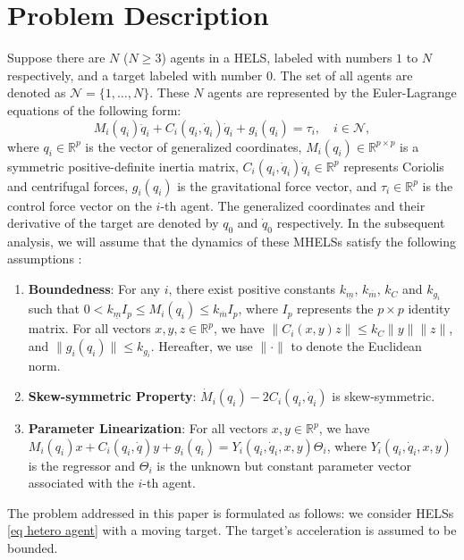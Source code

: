 \section{Problem Description}
\label{sec problem}

Suppose there are $N$ ($N\geq 3$) agents in a HELS, labeled with numbers $1$ to  $N$ respectively, and a target labeled with number 0.
The set of all agents are denoted as $\mathcal{N}=\{1,\dots,N\}$.
These $N$ agents are represented by the Euler-Lagrange equations of the following form:
\begin{equation}	
    M_i(q_i)\ddot{q}_i+C_i(q_i,\dot{q}_i)\dot{q}_i+g_i(q_i)=\tau_i,\quad i \in\mathcal{N},
    \label{eq hetero agent}
\end{equation}
where $q_i\in\mathbb{R}^p$ is the vector of generalized coordinates,
$M_i(q_i)\in\mathbb{R}^{p\times p}$ is a symmetric positive-definite inertia matrix,
$C_i(q_i,\dot{q}_i)\dot{q}_i\in\mathbb{R}^p$ represents Coriolis and centrifugal forces,
$g_i(q_i)$ is the gravitational force vector,
and $\tau_i\in\mathbb{R}^p$ is the control force vector on the $i$-th agent.
The generalized coordinates and their derivative of the target are denoted by $q_0$ and $\dot{q}_0$ respectively.
In the subsequent analysis, we will assume that the dynamics of these MHELSs satisfy the following assumptions \cite{spongRobotModelingControl2020}:
\begin{enumerate}
    \item[A1] \textbf{Boundedness}: For any $i$, there exist positive constants $k_{\underline m}$, $k_{\overline{m}}$, $k_{C}$ and $k_{g_{i}}$ such that $0 < k_{\underline{m}}I_{p}\leq M_{i}(q_{i})\leq k_{\overline{m}}I_{p}$, where $I_{p}$ represents the $p\times p$ identity matrix. For all vectors $x,y,z\in\mathbb{R}^p$, we have $\|C_i(x,y)z\|\leq k_{C}\|y\|\|z\|$, and $\|g_i(q_i)\|\leq k_{g_i}$. Hereafter, we use $\|\cdot\|$ to denote the Euclidean norm.
    \item[A2] \textbf{Skew-symmetric Property}: $\dot{M}_i(q_{i}) - 2C_{i}(q_{i},\dot{q}_{i})$ is skew-symmetric.
    \item[A3] \textbf{Parameter Linearization}: For all vectors $x,y\in\mathbb{R}^{p}$, we have $M_i(q_i)x + C_i(q_i,\dot{q})y + g_i(q_i)=Y_{i}(q_{i},\dot{q}_{i},x,y)\Theta_{i}$, where $Y_i(q_{i},\dot{q}_{i},x,y)$ is the regressor and $\Theta_i$ is the unknown but constant parameter vector associated with the $i$-th agent.
\end{enumerate}


The problem addressed in this paper is formulated as follows: 
we consider HELSs \eqref{eq hetero agent} with a moving target.
The target's acceleration is assumed to be bounded.

